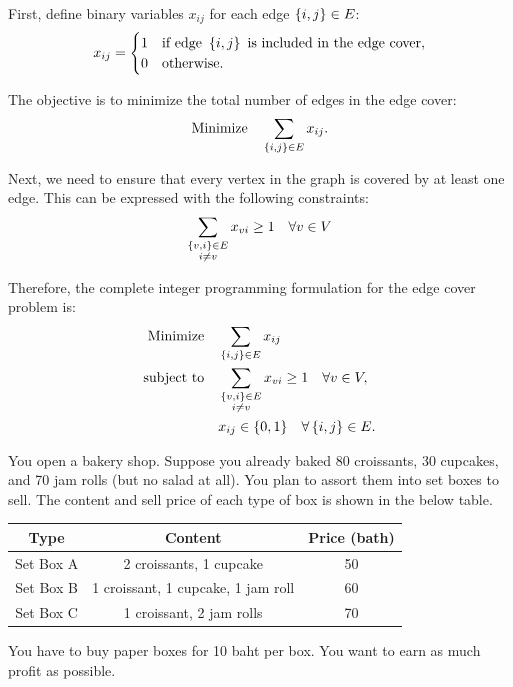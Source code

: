 \documentclass[a4paper, 10pt]{article}
\begin{document}
\begin{solution}
First, define binary variables \( x_{ij} \) for each edge \( \left\{i, j\right\} \in E \):
\[
x_{ij} =
\begin{cases}
1 & \text{if edge } \left\{i, j\right\} \text{ is included in the edge cover}, \\
0 & \text{otherwise}.
\end{cases}
\]

The objective is to minimize the total number of edges in the edge cover:
\[ \text{Minimize} \quad \sum_{\left\{i, j\right\} \in E} x_{ij}. \]

Next, we need to ensure that every vertex in the graph is covered by at least one edge.
This can be expressed with the following constraints:
\[ \sum_{ \substack{\left\{v, i\right\} \in E \\ i \neq v} } x_{vi} \geq 1 \quad \forall v \in V \]

Therefore, the complete integer programming formulation for the edge cover problem is:
\[
\begin{aligned}
\text{Minimize} \quad & \sum_{\left\{i, j\right\} \in E} x_{ij} \\
\text{subject to} \quad & \sum_{ \substack{\left\{v, i\right\} \in E \\ i \neq v} } x_{vi} \geq 1 \quad \forall v \in V, \\
& x_{ij} \in \{0, 1\} \quad \forall \left\{i, j\right\} \in E.
\end{aligned}
\]
\end{solution}

\newpage

\begin{problem}
You open a bakery shop. Suppose you already baked 80 croissants, 30 cupcakes, and 70 jam rolls (but no salad at all).
You plan to assort them into set boxes to sell.
The content and sell price of each type of box is shown in the below table.

\begin{center}
\renewcommand{\arraystretch}{1.2}
\begin{tabular}{|c|c|c|}
\hline
Type & Content & Price (bath) \\
\hline
Set Box A & 2 croissants, 1 cupcake & 50 \\
\hline
Set Box B & 1 croissant, 1 cupcake, 1 jam roll & 60 \\
\hline
Set Box C & 1 croissant, 2 jam rolls & 70 \\
\hline
\end{tabular}
\end{center}

\par\noindent You have to buy paper boxes for 10 baht per box.
You want to earn as much profit as possible.
\end{problem}
\end{document}
